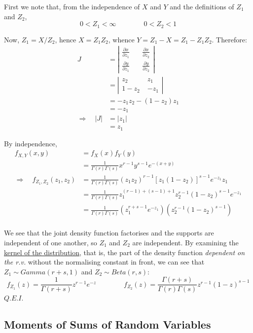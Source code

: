 \documentclass[12pt,a4paper]{article}
\begin{document}
\noindent First we note that, from the independence of $X$ and $Y$ and the definitions of $Z_1$ and $Z_2$,
$$0<Z_1<\infty\qquad\qquad 0<Z_2<1$$

Now, $Z_1 = X/Z_2$, hence $X = Z_1Z_2$, whence $Y=Z_1 - X = Z_1-Z_1Z_2$. Therefore:
\begingroup
\renewcommand*{\arraystretch}{1.5}
\begin{align*}
J &= \left|\begin{array}{cc} \frac{\partial x}{\partial z_1}\quad & \frac{\partial x}{\partial z_2}\\ \frac{\partial y}{\partial z_1}\quad & \frac{\partial y}{\partial z_2}\end{array}\right|\\
&= \left| \begin{array}{cc} z_2 \; & z_1\\ 1-z_2\; & -z_1 \end{array}\right|\\
&= -z_1z_2 - (1-z_2)z_1\\
&= -z_1\\
\Rightarrow\quad |J| &= |z_1|\\
&=z_1
\end{align*}
\endgroup

\noindent By independence,
\begin{align*}
f_{X,Y}(x,y) &= f_X(x)f_Y(y)\\
&= \frac{1}{\Gamma(r)\Gamma(s)}x^{r-1}y^{s-1}e^{-(x+y)}\\
\Rightarrow\quad f_{Z_1,Z_2}(z_1,z_2) &= \frac{1}{\Gamma(r)\Gamma(s)}(z_1z_2)^{r-1}[z_1(1-z_2)]^{s-1}e^{-z_1}z_1\\
&= \frac{1}{\Gamma(r)\Gamma(s)}z_1^{(r-1)+(s-1)+1}z_2^{r-1}(1-z_2)^{s-1}e^{-z_1}\\
&= \frac{1}{\Gamma(r)\Gamma(s)} (z_1^{r+s-1}e^{-z_1}) (z_2^{r-1}(1-z_2)^{s-1})\\
\end{align*}

We see that the joint density function factorises and the supports are independent of one another, so $Z_1$ and $Z_2$ are independent. By examining the \underline{kernel of the distribution}, that is, the part of the density function \emph{dependent on the r.v.} without the normalising constant in front, we can see that $Z_1 \sim Gamma(r+s,1)$ and $Z_2 \sim Beta(r,s)$:
$$f_{Z_1}(z) = \frac{1}{\Gamma(r+s)}z^{r-1}e^{-z}\qquad\qquad f_{Z_2}(z) = \frac{\Gamma(r+s)}{\Gamma(r)\Gamma(s)}z^{r-1}(1-z)^{s-1}$$
\hfill$Q.E.I.$

\subsection{Moments of Sums of Random Variables}\label{moments of sums}$\;$
\end{document}
